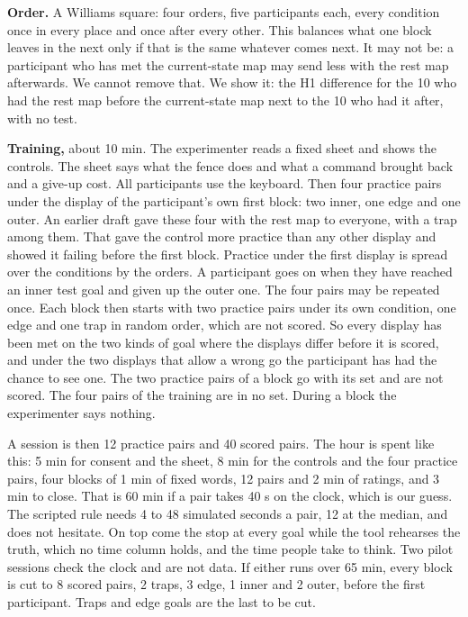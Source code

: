 \documentclass[pdflatex,sn-mathphys-num]{sn-jnl}
\begin{document}
\textbf{Order.} A Williams square: four orders, five participants each, every condition once in every place and
once after every other. %
This balances what one block leaves in the next only if that is the same whatever comes next. It may not be: a
participant who has met the current-state map may send less with the rest map afterwards. We cannot remove
that. We show it: the H1 difference for the 10 who had the rest map before the current-state map next to the 10
who had it after, with no test.

\textbf{Training,} about 10 min. The experimenter reads a fixed sheet and shows the controls. The sheet says what
the fence does and what a command brought back and a give-up cost. All participants use the keyboard. Then four
practice pairs under the display of the participant's own first block: two inner, one edge and one outer. An
earlier draft gave these four with the rest map to everyone, with a trap among them. That gave the control more
practice than any other display and showed it failing before the first block. Practice under the first display
is spread over the conditions by the orders. A participant goes on when they have reached an inner test goal and
given up the outer one. The four pairs may be repeated once. Each block then starts with two practice pairs under
its own condition, one edge and one trap in random order, which are not scored. So every display has been met on
the two kinds of goal where the displays differ before it is scored, and under the two displays that allow a
wrong go the participant has had the chance to see one. The two practice pairs of a block go with its set and
are not scored. The four pairs of the training are in no set. During a block the
experimenter says nothing.

A session is then 12 practice pairs and 40 scored pairs. The hour is spent like this: 5 min for consent and the
sheet, 8 min for the controls and the four practice pairs, four blocks of 1 min of fixed words, 12 pairs and
2 min of ratings, and 3 min to close. That is 60 min if a pair takes 40 s on the clock, which is our guess. The
scripted rule needs 4 to 48 simulated seconds a pair, 12 at the median, and does not hesitate. %
On top come the stop at every goal while the tool rehearses the truth, which no time column holds, and the time
people take to think. Two pilot sessions check the clock and are not data. If either runs over 65 min, every
block is cut to 8 scored pairs, 2 traps, 3 edge, 1 inner and 2 outer, before the first participant. Traps and
edge goals are the last to be cut.
\end{document}
